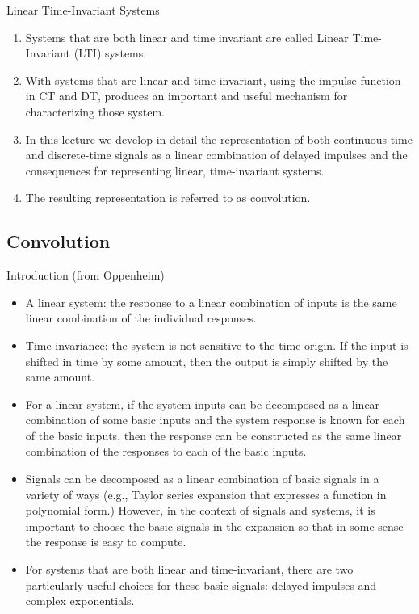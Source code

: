 \begin{frame}{Linear Time-Invariant Systems}
    \begin{enumerate}
        \item Systems that are both linear and time invariant are called Linear Time-Invariant (LTI) systems.
        \item With systems that are linear and time invariant, using the impulse function in CT and DT, produces an important and useful mechanism for characterizing those system.
        \item In this lecture we develop in detail the representation of both continuous-time and discrete-time signals as a linear combination of delayed impulses and the consequences for representing linear, time-invariant systems.
        \item The resulting representation is referred to as convolution.
    \end{enumerate}
\end{frame}


\subsection{Convolution}

\begin{frame}{Introduction (from Oppenheim)}
    \begin{itemize}
        \item A linear system: the response to a linear combination of inputs is the same linear combination of the individual responses.
        \item Time invariance: the system is not sensitive to the time origin. If the input is shifted in time by some amount, then the output is simply shifted by the same amount.
        \item For a linear system, if the system inputs can be decomposed as a linear combination of some basic inputs and the system response is known for each of the basic inputs, then the response can be constructed as the same linear combination of the responses to each of the basic inputs.
        \item Signals can be decomposed as a linear combination of basic signals in a variety of ways (e.g., Taylor series expansion that expresses a function in polynomial form.) However, in the context of signals and systems, it is important to choose the basic signals in the expansion so that in some sense the response is easy to compute.
        \item For systems that are both linear and time-invariant, there are two particularly useful choices for these basic signals: delayed impulses and complex exponentials.
    \end{itemize}
\end{frame}

